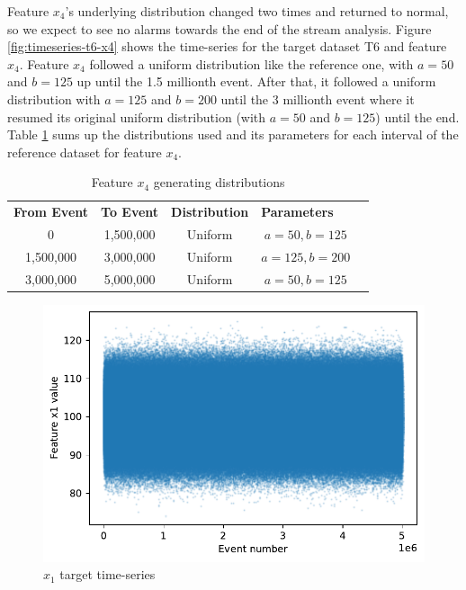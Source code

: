 \documentclass[sigconf]{acmart}
\begin{document}
Feature $x_4$'s underlying distribution changed two times and returned to normal, so we expect to see no alarms towards the end of the stream analysis. Figure \ref{fig:timeseries-t6-x4} shows the time-series for the target dataset T6 and feature $x_4$. Feature $x_4$ followed a uniform distribution like the reference one, with $a=50$ and $b=125$ up until the 1.5 millionth event. After that, it followed a uniform distribution with $a=125$ and $b=200$ until the 3 millionth event where it resumed its original uniform distribution (with $a=50$ and $b=125$) until the end. Table \ref{tbl:multi-feat-x4-changes} sums up the distributions used and its parameters for each interval of the reference dataset for feature $x_4$.
\begin{table}[!htb]
    \begin{center}
    \begin{tabular}{|c|c|c|c|l}
    \cline{1-4}
    \textbf{From Event} & \textbf{To Event} & \textbf{Distribution} & \multicolumn{1}{l|}{\textbf{Parameters}} &  \\ \cline{1-4}
    0                   & 1,500,000         & Uniform               & $a=50, b=125$                            &  \\ \cline{1-4}
    1,500,000           & 3,000,000         & Uniform               & $a=125, b=200$                           &  \\ \cline{1-4}
    3,000,000           & 5,000,000         & Uniform               & $a=50, b=125$                            &  \\ \cline{1-4}
    \end{tabular}
    \end{center}
    \caption{Feature $x_4$ generating distributions}
    \label{tbl:multi-feat-x4-changes}
\end{table}
\begin{figure}[!htb]
    \begin{center}
      \includegraphics[scale=0.5]{figures/timeseries-t6-x1.pdf} 
      \caption{$x_1$ target time-series} 
      \label{fig:timeseries-t6-x1} 
    \end{center}
\end{figure}
\end{document}
